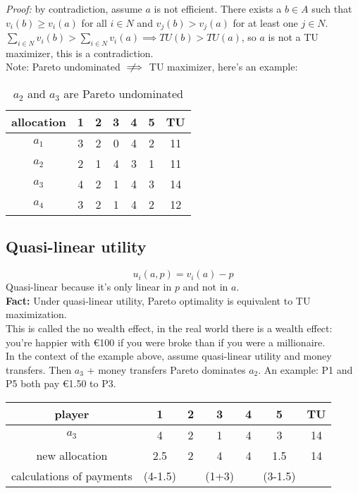 \documentclass{article}
\newcommand{\notimplies}{%
  \mathrel{{\ooalign{\hidewidth$\not\phantom{=}$\hidewidth\cr$\implies$}}}}
\begin{document}
\noindent
\textit{Proof:} by contradiction, assume $a$ is not efficient. There exists a $b\in A$ such that $v_i(b)\geq v_i(a)$ for all $i\in N$ and $v_j(b)>v_j(a)$ for at least one $j\in N$. $\sum_{i\in N} v_i(b)>\sum_{i \in N} v_i(a)\implies TU(b)>TU(a)$, so $a$ is not a TU maximizer, this is a contradiction.\\

\noindent
Note: Pareto undominated $\notimplies$ TU maximizer, here's an example:


\begin{table}
    \centering
    \begin{tabular}{c|c|c|c|c|c|c}
    allocation & 1 & 2 & 3 & 4 & 5 & TU \\ \hline
    $a_1$      & 3 & 2 & 0 & 4 & 2 & 11 \\
    $a_2$      & 2 & 1 & 4 & 3 & 1 & 11 \\
    $a_3$      & 4 & 2 & 1 & 4 & 3 & 14 \\
    $a_4$      & 3 & 2 & 1 & 4 & 2 & 12 \\
\end{tabular}
\caption*{$a_2$ and $a_3$ are Pareto undominated}
\end{table}
\newpage

\subsection*{Quasi-linear utility}
\begin{equation*}
    u_i(a,p)=v_i(a)-p
\end{equation*}
\noindent
Quasi-linear because it's only linear in $p$ and not in $a$.\\

\noindent
\textbf{Fact:} Under quasi-linear utility, Pareto optimality is equivalent to TU maximization.\\
\noindent
This is called the no wealth effect, in the real world there is a wealth effect: you're happier with \euro 100 if you were broke than if you were a millionaire.\\

\noindent
In the context of the example above, assume quasi-linear utility and money transfers. Then $a_3$ + money transfers Pareto dominates $a_2$. An example: P1 and P5 both pay \euro 1.50 to P3.\\

\begin{center}
\begin{tabular}{c|ccccc|c}
    player & 1 & 2 & 3 & 4 & 5 & TU\\ \hline
    $a_3$ & 4 & 2 & 1 & 4 & 3 & 14 \\
    new allocation & 2.5 & 2 & 4 & 4 & 1.5 & 14 \\
    calculations of payments & (4-1.5) & & (1+3) & & (3-1.5) & 
\end{tabular}
\end{center}
\end{document}
